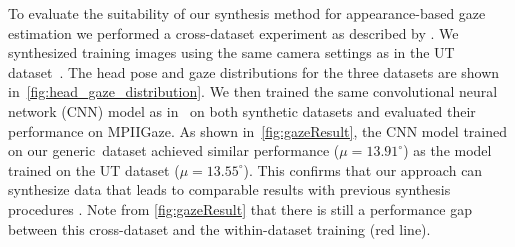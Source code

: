To evaluate the suitability of our synthesis method for appearance-based gaze estimation we performed a cross-dataset experiment as described by \citet{zhang15_cvpr}.
We synthesized training images using the same camera settings as in the UT dataset~\cite{sugano2014learning}.
The head pose and gaze distributions for the three datasets are shown in~\autoref{fig:head_gaze_distribution}.
We then trained the same convolutional neural network (CNN) model as in~\cite{zhang15_cvpr} on both synthetic datasets and evaluated their performance on MPIIGaze.
As shown
in~\autoref{fig:gazeResult}, the CNN model trained on our generic~\dataset dataset achieved similar performance ($\mu\!=\!13.91^{\circ}$) as the model trained on the UT dataset \mbox{($\mu\!=\!13.55^{\circ}$)}.
This confirms that our approach can synthesize data that leads to comparable results with previous synthesis procedures \cite{sugano2014learning}.
Note from \autoref{fig:gazeResult} that there is still a performance gap between this cross-dataset and the within-dataset training (red line).


